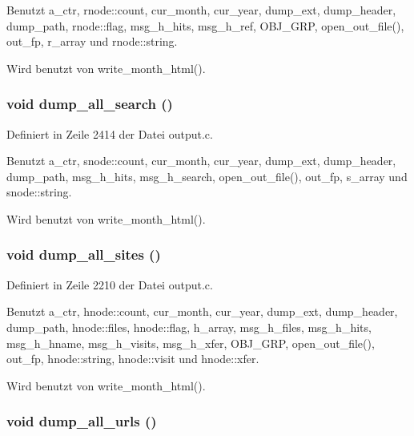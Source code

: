 Benutzt a\_\-ctr, rnode::count, cur\_\-month, cur\_\-year, dump\_\-ext, dump\_\-header, dump\_\-path, rnode::flag, msg\_\-h\_\-hits, msg\_\-h\_\-ref, OBJ\_\-GRP, open\_\-out\_\-file(), out\_\-fp, r\_\-array und rnode::string.

Wird benutzt von write\_\-month\_\-html().
\subsubsection{\setlength{\rightskip}{0pt plus 5cm}void dump\_\-all\_\-search ()}\label{output_8c_46280cc9688bd8a784859589d0ca588e}




Definiert in Zeile 2414 der Datei output.c.

Benutzt a\_\-ctr, snode::count, cur\_\-month, cur\_\-year, dump\_\-ext, dump\_\-header, dump\_\-path, msg\_\-h\_\-hits, msg\_\-h\_\-search, open\_\-out\_\-file(), out\_\-fp, s\_\-array und snode::string.

Wird benutzt von write\_\-month\_\-html().
\subsubsection{\setlength{\rightskip}{0pt plus 5cm}void dump\_\-all\_\-sites ()}\label{output_8c_1ff4091dce5e22d1f8f4cc034a78afec}




Definiert in Zeile 2210 der Datei output.c.

Benutzt a\_\-ctr, hnode::count, cur\_\-month, cur\_\-year, dump\_\-ext, dump\_\-header, dump\_\-path, hnode::files, hnode::flag, h\_\-array, msg\_\-h\_\-files, msg\_\-h\_\-hits, msg\_\-h\_\-hname, msg\_\-h\_\-visits, msg\_\-h\_\-xfer, OBJ\_\-GRP, open\_\-out\_\-file(), out\_\-fp, hnode::string, hnode::visit und hnode::xfer.

Wird benutzt von write\_\-month\_\-html().
\subsubsection{\setlength{\rightskip}{0pt plus 5cm}void dump\_\-all\_\-urls ()}\label{output_8c_d1bfd511fab3836f3e1d1867384b425f}




